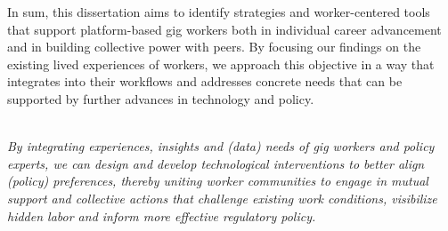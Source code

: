In sum, this dissertation aims to identify strategies and worker-centered tools that support platform-based gig workers both in individual career advancement and in building collective power with peers. By focusing our findings on the existing lived experiences of workers, we approach this objective in a way that integrates into their workflows and addresses concrete needs that can be supported by further advances in technology and policy. \\ \\
\begin{tcolorbox}[colback=maroon!10,
colframe=maroon!60,
fonttitle=\bfseries,
fontupper=\normalsize\selectfont, 
title=\textbf{Thesis Statement}]
\textit{By integrating experiences, insights and (data) needs of gig workers and policy experts, we can design and develop technological interventions to better align (policy) preferences, thereby uniting worker communities to engage in mutual support and collective actions that challenge existing work conditions, visibilize hidden labor and inform more effective regulatory policy.
}
\end{tcolorbox}